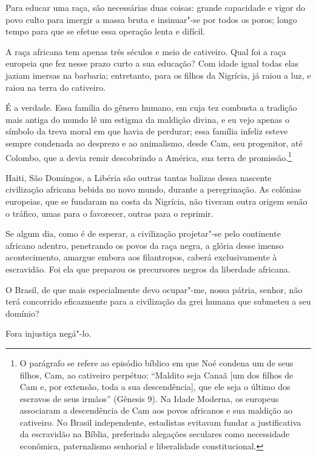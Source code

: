 \begin{linenumbers}
Para educar uma raça, são necessárias duas coisas: grande capacidade e
vigor do povo culto para imergir a massa bruta e insinuar"-se por
todos os poros; longo tempo para que se efetue essa operação lenta e difícil.

A raça africana tem apenas três séculos e meio de cativeiro. Qual foi a \label{tresseculos}
raça europeia que fez nesse prazo curto a sua educação? Com idade igual
todas elas jaziam imersas na barbaria; entretanto, para os filhos da
Nigrícia, já raiou a luz, e raiou na terra do cativeiro.

É a verdade. Essa família do gênero humano, em cuja tez combusta a
tradição mais antiga do mundo lê um estigma da maldição divina, e eu
vejo apenas o símbolo da treva moral em que havia de perdurar; essa
família infeliz esteve sempre condenada ao desprezo e ao animalismo,
desde Cam, seu progenitor, até Colombo, que a devia remir descobrindo a
América, sua terra de promissão.\footnote{ O parágrafo se refere ao episódio 
bíblico em que Noé condena um de seus filhos, Cam, ao cativeiro perpétuo: 
``Maldito seja Canaã [um dos filhos de Cam e, por extensão, toda a sua descendência], 
que ele seja o último dos escravos de seus irmãos'' (Gênesis 9). Na Idade Moderna, 
os europeus associaram a descendência de Cam aos povos africanos e sua maldição ao 
cativeiro. No Brasil independente, estadistas evitavam fundar a justificativa da 
escravidão na Bíblia, preferindo alegações seculares como necessidade econômica, paternalismo
senhorial e liberalidade constitucional.}

Haiti, São Domingos, a Libéria são outras tantas balizas dessa nascente
civilização africana bebida no novo mundo, durante a peregrinação. As
colônias europeias, que se fundaram na costa da Nigrícia, não tiveram
outra origem senão o tráfico, umas para o favorecer, outras para o reprimir.

Se algum dia, como é de esperar, a civilização projetar"-se pelo
continente africano adentro, penetrando os povos da raça negra, a
glória desse imenso acontecimento, amargue embora aos filantropos,
caberá exclusivamente à escravidão. Foi ela que preparou os precursores
negros da liberdade africana.

O Brasil, de que mais especialmente devo ocupar"-me, nossa pátria,
senhor, não terá concorrido eficazmente para a civilização da grei
humana que submeteu a seu domínio?

Fora injustiça negá"-lo.


\end{linenumbers}
